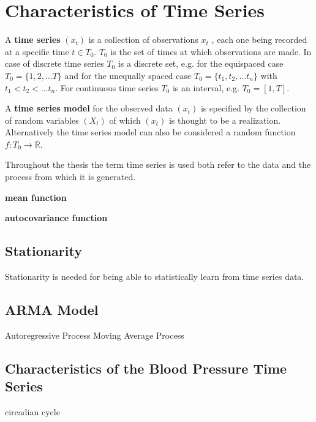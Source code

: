 

\chapter{Characteristics of Time Series}

A \textbf{time series} $(x_t)$ is a collection of observations $x_t$ ,
each one being recorded at a specific time $t \in T_0$.
$T_0$ is the set of times at which observations are made.
In case of discrete time series $T_0$ is a discrete set, e.g. for the equispaced case $T_0 = \{1, 2, \dots T\}$ and
for the unequally spaced case $T_0 = \{t_1, t_2, \dots t_n\}$ with $t_1 < t_2 < \dots t_n$.
For continuous time series $T_0$ is an interval, e.g. $T_0 = [1, T]$.

A \textbf{time series model} for the observed data $(x_t)$ is specified by the collection of random variables
$(X_t)$ of which $(x_t)$ is thought to be a realization.
Alternatively the time series model can also be considered a random function $f: T_0 \to \mathbb{R}$.

Throughout the thesis the term time series is used both refer to the data and the process from which it is generated.


\textbf{mean function}

\textbf{autocovariance function}


\section{Stationarity}
Stationarity is needed for being able to statistically learn from time series data.



\section{ARMA Model}

Autoregressive Process
Moving Average Process



\section{Characteristics of the Blood Pressure Time Series}

circadian cycle






